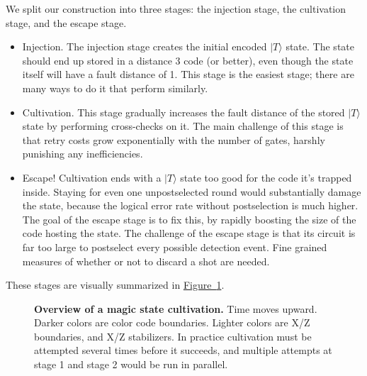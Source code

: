 \documentclass[onecolumn,unpublished,a4paper]{quantumarticle}
\theoremstyle{definition}
\newcommand{\fig}[1]{\hyperref[fig:#1]{Figure~\ref*{fig:#1}}}
\begin{document}
We split our construction into three stages: the injection stage, the cultivation stage, and the escape stage.

\begin{itemize}
    \item
    Injection.
    The injection stage creates the initial encoded $|T\rangle$ state.
    The state should end up stored in a distance 3 code (or better), even though the state itself will have a fault distance of 1.
    This stage is the easiest stage; there are many ways to do it that perform similarly.
    \item
    Cultivation.
    This stage gradually increases the fault distance of the stored $|T\rangle$ state by performing cross-checks on it.
    The main challenge of this stage is that retry costs grow exponentially with the number of gates, harshly punishing any inefficiencies.
    \item
    Escape!
    Cultivation ends with a $|T\rangle$ state too good for the code it's trapped inside.
    Staying for even one unpostselected round would substantially damage the state, because the logical error rate without postselection is much higher.
    The goal of the escape stage is to fix this, by rapidly boosting the size of the code hosting the state.
    The challenge of the escape stage is that its circuit is far too large to postselect every possible detection event.
    Fine grained measures of whether or not to discard a shot are needed.
\end{itemize}

These stages are visually summarized in \fig{construction-overview}.

\begin{figure}
    \centering
    \caption{
        \textbf{Overview of a magic state cultivation.}
        Time moves upward.
        Darker colors are color code boundaries.
        Lighter colors are X/Z boundaries, and X/Z stabilizers.
        In practice cultivation must be attempted several times before it succeeds, and multiple attempts at stage 1 and stage 2 would be run in parallel.
    }
    \label{fig:construction-overview}
\end{figure}
\end{document}
